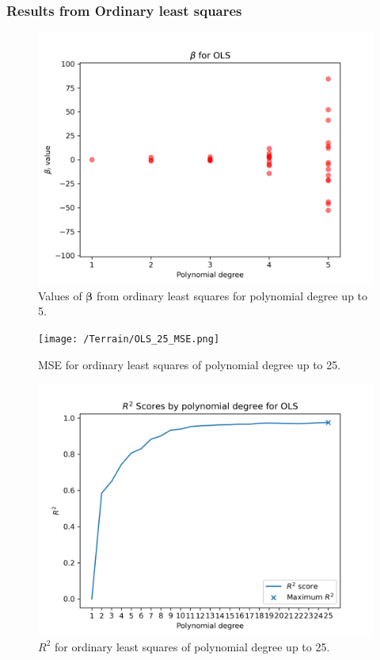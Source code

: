 \documentclass{article}
\begin{document}
\subsubsection{Results from Ordinary least squares}
\begin{figure}[htbp]
    \centering
    \includegraphics[width=\textwidth*2/3]{Terrain/OLS_5_betas.png}
    \caption{Values of $\boldsymbol{\beta}$ from ordinary least squares for polynomial degree up to 5.}
    \label{fig:TerrainOLS5Beta}
\end{figure}

\begin{figure}[htbp]
    \centering
    \texttt{[image: /Terrain/OLS\_25\_MSE.png]}
    \caption{MSE for ordinary least squares of polynomial degree up to 25.}
    \label{fig:TerrainOLS5MSE}
\end{figure}

\begin{figure}[htbp]
    \centering
    \includegraphics[width=\textwidth*2/3]{Project1/figures/Terrain/OLS_25_R2.png}
    \caption{$R^2$ for ordinary least squares of polynomial degree up to 25.}
    \label{fig:TerrainOLS5R2}
\end{figure}
\end{document}
